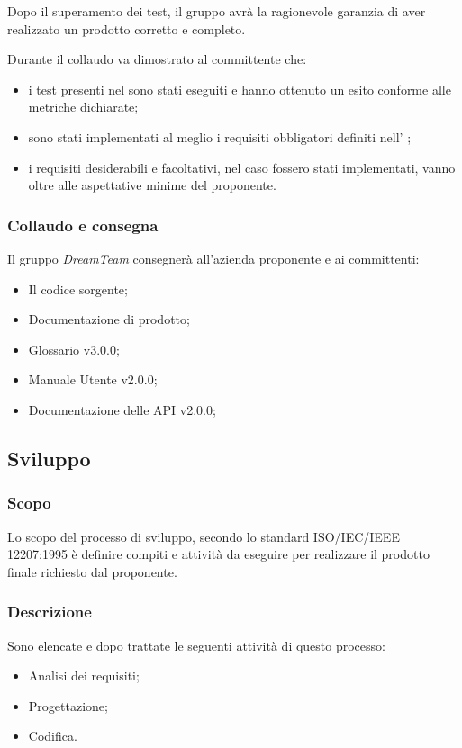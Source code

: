 Dopo il superamento  dei test, il gruppo avrà la ragionevole garanzia di aver realizzato un prodotto corretto e completo.

Durante il collaudo va dimostrato al committente che:
\begin{itemize}
\item i test presenti nel \PdQ sono stati eseguiti e hanno ottenuto un esito conforme alle metriche dichiarate;
\item sono stati implementati al meglio i requisiti obbligatori definiti nell' \AdR ;
\item i requisiti desiderabili e facoltativi, nel caso fossero stati implementati, vanno oltre
alle aspettative minime del proponente.
\end{itemize}

\subsubsection{Collaudo e consegna}

Il gruppo \textit{DreamTeam} consegnerà all’azienda proponente e ai committenti:
\begin{itemize}
\item Il codice sorgente;
\item Documentazione di prodotto;
\item Glossario v3.0.0;
\item Manuale Utente v2.0.0;
\item Documentazione delle API v2.0.0;
\end{itemize}
\subsection{Sviluppo}

\subsubsection{Scopo}
Lo scopo del processo di sviluppo, secondo lo standard  ISO/IEC/IEEE 12207:1995 è definire compiti e attività da eseguire per realizzare il prodotto finale richiesto dal proponente.

\subsubsection{Descrizione}
Sono elencate e dopo trattate le seguenti attività di questo processo:
\begin{itemize}
  \item Analisi dei requisiti;
  \item Progettazione;
  \item Codifica.
\end{itemize}

